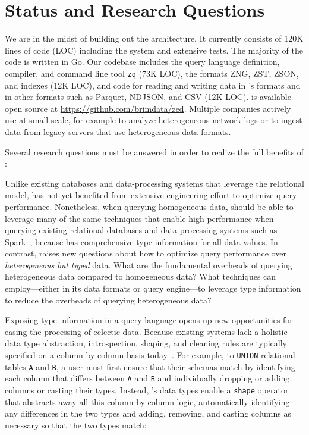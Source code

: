 \section{Status and Research Questions} \label{s:questions}

We are in the midst of building out the \sys{} architecture. It currently consists of 120K lines of code (LOC) including the \sys{} system and extensive tests. The majority of the code is written in Go. Our codebase includes the query language definition, compiler, and command line tool \texttt{zq} (73K LOC), the formats ZNG, ZST, ZSON, and indexes (12K LOC), and code for reading and writing data in \sys{}'s formats and in other formats such as Parquet, NDJSON, and CSV (12K LOC). \sys{} is available open source at \url{https://github.com/brimdata/zed}. Multiple companies actively use \sys{} at small scale, for example to analyze heterogeneous network logs or to ingest data from legacy servers that use heterogeneous data formats.


Several research questions must be answered in order to realize the full benefits of \sys{}:

 Unlike existing databases and data-processing systems that leverage the relational model, \sys{} has not yet benefited from extensive engineering effort to optimize query performance. Nonetheless, when querying homogeneous data, \sys{} should be able to leverage many of the same techniques that enable high performance when querying existing relational databases and data-processing systems such as Spark~\cite{spark}, because \sys{} has comprehensive type information for all data values. In contrast, \sys{} raises new questions about how to optimize query performance over {\em heterogeneous but typed} data. What are the fundamental overheads of querying heterogeneous data compared to homogeneous data? What techniques can \sys{} employ---either in its data formats or query engine---to leverage type information to reduce the overheads of querying heterogeneous data?

 Exposing type information in a query language opens up new opportunities for easing the processing of eclectic data. Because existing systems lack a holistic data type abstraction, introspection, shaping, and cleaning rules are typically specified on a column-by-column basis today~\cite{bidel, codel}. For example, to \texttt{UNION} relational tables \texttt{A} and \texttt{B}, a user must first ensure that their schemas match by identifying each column that differs between \texttt{A} and \texttt{B} and individually dropping or adding columns or casting their types. Instead, \sys{}'s data types enable a \texttt{shape} operator that abstracts away all this column-by-column logic, automatically identifying any differences in the two types and adding, removing, and casting columns as necessary so that the two types match:

